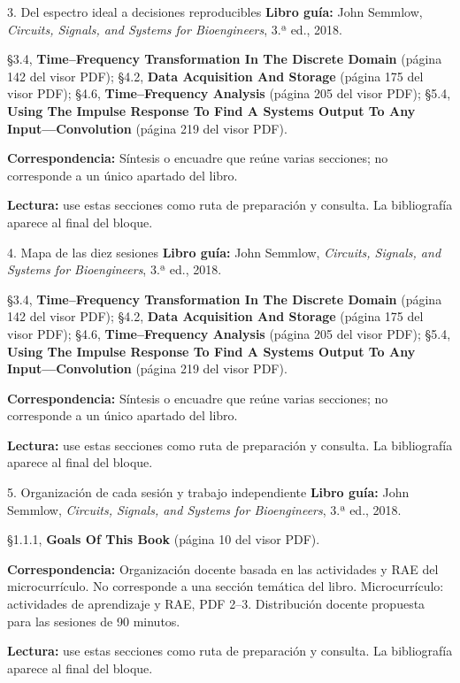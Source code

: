\documentclass[
  10pt,
  ignorenonframetext,
  aspectratio=169,
  spanish,
]{beamer}
\begin{document}
\begin{frame}{3. Del espectro ideal a decisiones reproducibles}
\label{del-espectro-ideal-a-decisiones-reproducibles}
\textbf{Libro guía:} John Semmlow, \emph{Circuits, Signals, and Systems
for Bioengineers}, 3.ª ed., 2018.

§3.4, \textbf{Time--Frequency Transformation In The Discrete Domain}
(página 142 del visor PDF); §4.2, \textbf{Data Acquisition And Storage}
(página 175 del visor PDF); §4.6, \textbf{Time--Frequency Analysis}
(página 205 del visor PDF); §5.4, \textbf{Using The Impulse Response To
Find A Systems Output To Any Input---Convolution} (página 219 del visor
PDF).

\textbf{Correspondencia:} Síntesis o encuadre que reúne varias
secciones; no corresponde a un único apartado del libro.

\textbf{Lectura:} use estas secciones como ruta de preparación y
consulta. La bibliografía aparece al final del bloque.
\end{frame}

\begin{frame}{4. Mapa de las diez sesiones}
\label{mapa-de-las-diez-sesiones-1}
\textbf{Libro guía:} John Semmlow, \emph{Circuits, Signals, and Systems
for Bioengineers}, 3.ª ed., 2018.

§3.4, \textbf{Time--Frequency Transformation In The Discrete Domain}
(página 142 del visor PDF); §4.2, \textbf{Data Acquisition And Storage}
(página 175 del visor PDF); §4.6, \textbf{Time--Frequency Analysis}
(página 205 del visor PDF); §5.4, \textbf{Using The Impulse Response To
Find A Systems Output To Any Input---Convolution} (página 219 del visor
PDF).

\textbf{Correspondencia:} Síntesis o encuadre que reúne varias
secciones; no corresponde a un único apartado del libro.

\textbf{Lectura:} use estas secciones como ruta de preparación y
consulta. La bibliografía aparece al final del bloque.
\end{frame}

\begin{frame}{5. Organización de cada sesión y trabajo independiente}
\label{organizaciuxf3n-de-cada-sesiuxf3n-y-trabajo-independiente-1}
\textbf{Libro guía:} John Semmlow, \emph{Circuits, Signals, and Systems
for Bioengineers}, 3.ª ed., 2018.

§1.1.1, \textbf{Goals Of This Book} (página 10 del visor PDF).

\textbf{Correspondencia:} Organización docente basada en las actividades
y RAE del microcurrículo. No corresponde a una sección temática del
libro. Microcurrículo: actividades de aprendizaje y RAE, PDF 2--3.
Distribución docente propuesta para las sesiones de 90 minutos.

\textbf{Lectura:} use estas secciones como ruta de preparación y
consulta. La bibliografía aparece al final del bloque.
\end{frame}
\end{document}
